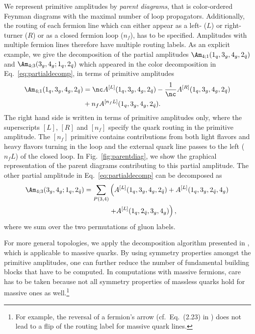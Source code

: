 We represent primitive amplitudes by \textit{parent diagrams},
that is color-ordered Feynman diagrams with the maximal number of loop
propagators. Additionally, the routing of
each fermion line which can either appear as a left- ($L$) or
right-turner ($R$) or as a closed
fermion loop ($n_f$), has to be specified. Amplitudes with
multiple fermion lines therefore have multiple routing labels. As an explicit example, we give the decomposition of
the partial amplitudes $\Am_{4;1}(1_q,3_g,4_g,2_{\bar q})$ and $\Am_{4;3}(3_g,4_g;1_q,2_{\bar q})$ which
appeared in the color decomposition in Eq.~\eqref{eq:partialdecomp}, in terms of primitive amplitudes
\begin{align}
\begin{split}
 \Am_{4;1}(1_q,3_g,4_g,2_{\bar{q}})&=\nc
 A^{[L]}(1_q,3_g,4_g,2_{\bar{q}})-\frac{1}{\nc}
 A^{[R]}(1_q,3_g,4_g,2_{\bar q})\\
&+ n_fA^{[n_fL]}(1_q,3_g,4_g,2_{\bar q}).
\end{split}
\end{align}
The right hand side is written in terms of primitive amplitudes only, where the superscripts $[L]$, $[R]$ and $[n_f]$ specify the quark routing in the primitive amplitude. The $[n_f]$ primitive contains contributions from both light flavors and heavy flavors turning
in the loop and the external quark line passes to the left ($n_fL$) of
the closed loop. In Fig.~\ref{fig:parentdiag}, we show the
graphical representation of the parent diagrams contributing to this partial
amplitude. The other partial amplitude in Eq.~\eqref{eq:partialdecomp} can be decomposed as
\begin{align}
\begin{split}
\Am_{4;3}(3_g,4_g;1_q,2_{\bar q})= \sum_{P(3,4)}& \left( A^{[L]}(1_q,3_g,4_g,2_{\bar{q}})+A^{[L]}(1_q,3_g,2_{\bar{q}},4_g) \right.\\
&\left.+ A^{[L]}(1_q,2_{\bar{q}},3_g,4_g)\right),
\end{split}
\end{align}
where we sum over the two permutations of gluon labels.

For more general topologies, we apply the decomposition algorithm
presented in \cite{Ita:2011ar}, which is applicable to massive quarks. By
using symmetry properties amongst the primitive amplitudes, one can
further reduce the number of fundamental building blocks that have to
be computed. In computations with massive fermions, care has to be
taken because not all symmetry properties of massless quarks hold for
massive ones as well.\footnote{For example, the reversal of a fermion's arrow (cf.~Eq.~(2.23) in
\cite{Ita:2011ar}) does not lead to a flip of the routing label for massive
quark lines.}



